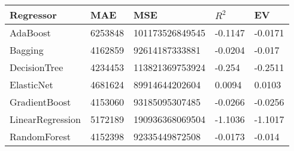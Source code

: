 \begin{tabular}{|p{3cm}p{1.5cm}p{2.5cm}p{1.2cm}p{1.2cm}|}
  \hline
Regressor & MAE & MSE & $R^2$ & EV \\ 
  \hline \hline
AdaBoost & 6253848 & 101173526849545 & -0.1147 & -0.0171 \\ 
  Bagging & 4162859 & 92614187333881 & -0.0204 & -0.017 \\ 
  DecisionTree & 4234453 & 113821369753924 & -0.254 & -0.2511 \\ 
  ElasticNet & 4681624 & 89914644202604 & 0.0094 & 0.0103 \\ 
  GradientBoost & 4153060 & 93185095307485 & -0.0266 & -0.0256 \\ 
  LinearRegression & 5172189 & 190936368069504 & -1.1036 & -1.1017 \\ 
  RandomForest & 4152398 & 92335449872508 & -0.0173 & -0.014 \\ 
   \hline
\end{tabular}
